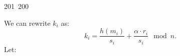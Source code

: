 201~200~\documentclass{article}
\begin{document}
	                                                                        	                                                                    	                                	                    	                    	                        	                        	                    	                                                                	                	                                                                    	                    			We can rewrite $k_i$ as:
	                                                                        	                                                                    	                                	                    	                    	                        	                        	                    	                                                                	                	                                                                    	                    			\[
	                                                                        	                                                                    	                                	                    	                    	                        	                        	                    	                                                                	                	                                                                    	                    				k_i = \frac{h(m_i)}{s_i} + \frac{\alpha \cdot r_i}{s_i} \mod n.
	                                                                        	                                                                    	                                	                    	                    	                        	                        	                    	                                                                	                	                                                                    	                    				\]
	                                                                        	                                                                    	                                	                    	                    	                        	                        	                    	                                                                	                	                                                                    	                    				Let:
\end{document}
